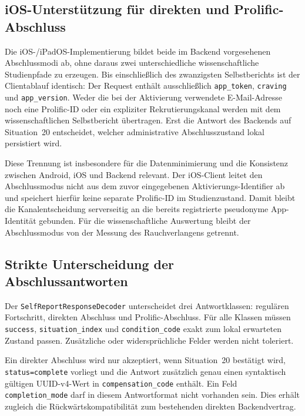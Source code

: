 
\begin{neu}
\section{iOS-Unterstützung für direkten und Prolific-Abschluss}

Die iOS-/iPadOS-Implementierung bildet beide im Backend vorgesehenen Abschlussmodi ab, ohne daraus zwei unterschiedliche wissenschaftliche Studienpfade zu erzeugen. Bis einschließlich des zwanzigsten Selbstberichts ist der Clientablauf identisch: Der Request enthält ausschließlich \texttt{app\_token}, \texttt{craving} und \texttt{app\_version}. Weder die bei der Aktivierung verwendete E-Mail-Adresse noch eine Prolific-ID oder ein expliziter Rekrutierungskanal werden mit dem wissenschaftlichen Selbstbericht übertragen. Erst die Antwort des Backends auf Situation~20 entscheidet, welcher administrative Abschlusszustand lokal persistiert wird.

Diese Trennung ist insbesondere für die Datenminimierung und die Konsistenz zwischen Android, iOS und Backend relevant. Der iOS-Client leitet den Abschlussmodus nicht aus dem zuvor eingegebenen Aktivierungs-Identifier ab und speichert hierfür keine separate Prolific-ID im Studienzustand. Damit bleibt die Kanalentscheidung serverseitig an die bereits registrierte pseudonyme App-Identität gebunden. Für die wissenschaftliche Auswertung bleibt der Abschlussmodus von der Messung des Rauchverlangens getrennt.

\subsection{Strikte Unterscheidung der Abschlussantworten}

Der \texttt{SelfReportResponseDecoder} unterscheidet drei Antwortklassen: regulären Fortschritt, direkten Abschluss und Prolific-Abschluss. Für alle Klassen müssen \texttt{success}, \texttt{situation\_index} und \texttt{condition\_code} exakt zum lokal erwarteten Zustand passen. Zusätzliche oder widersprüchliche Felder werden nicht toleriert.

Ein direkter Abschluss wird nur akzeptiert, wenn Situation~20 bestätigt wird, \texttt{status=complete} vorliegt und die Antwort zusätzlich genau einen syntaktisch gültigen UUID-v4-Wert in \texttt{compensation\_code} enthält. Ein Feld \texttt{completion\_mode} darf in diesem Antwortformat nicht vorhanden sein. Dies erhält zugleich die Rückwärtskompatibilität zum bestehenden direkten Backendvertrag.


\end{neu}
